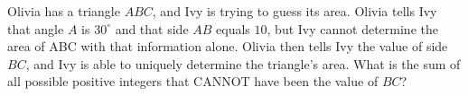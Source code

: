 Olivia has a triangle $ABC$, and Ivy is trying to guess its area. Olivia tells Ivy that angle $A$ is $30^{\circ}$ and that side $AB$ equals $10$, but Ivy cannot determine the area of ABC with that information alone. Olivia then tells Ivy the value of side $BC$, and Ivy is able to uniquely determine the triangle's area. What is the sum of all possible positive integers that CANNOT have been the value of $BC$?
